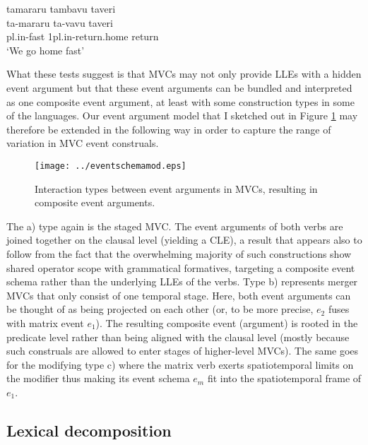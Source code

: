 \ea \label{Wooi41} 
\gll tamararu tambavu taveri \\
ta-mararu ta-vavu taveri \\
\acs{pl}.\acs{in}-fast 1\acs{pl}.\acs{in}-return.home return\\
\glft `We go home fast' \ 
\z
\xe

What these tests suggest is that MVCs may not only provide LLEs with a hidden event argument but that these event arguments can be bundled and interpreted as one composite event argument, at least with some construction types in some of the languages. Our event argument model that I sketched out in Figure \ref{fig:eventsmod} may therefore be extended in the following way in order to capture the range of variation in MVC event construals.

\begin{figure}

\texttt{[image: ../eventschemamod.eps]} 
\caption{Interaction types between event arguments in MVCs, resulting in composite event arguments.}\label{fig:eventsmod}

\end{figure}


The a) type again is the staged MVC. The event arguments of both verbs are joined together on the clausal level (yielding a CLE), a result that appears also to follow from the fact that the overwhelming majority of such constructions show shared operator scope with grammatical formatives, targeting a composite event schema rather than the underlying LLEs of the verbs. Type b) represents merger MVCs that only consist of one temporal stage. Here, both event arguments can be thought of as being projected on each other (or, to be more precise, $e_2$ fuses with matrix event $e_1$). The resulting composite event (argument) is rooted in the predicate level rather than being aligned with the clausal level (mostly because such construals are allowed to enter stages of higher-level MVCs). The same goes for the modifying type c) where the matrix verb exerts spatiotemporal limits on the modifier thus making its event schema $e_m$ fit into the spatiotemporal frame of $e_1$.

\subsection{Lexical decomposition} \label{sec:decomposition}

